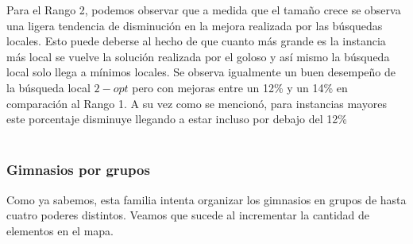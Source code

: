 Para el Rango 2, podemos observar que a medida que el tamaño crece se observa una ligera tendencia de disminución en la mejora realizada por las búsquedas locales. Esto puede deberse al hecho de que cuanto más grande es la instancia más local se vuelve la solución realizada por el goloso y así mismo la búsqueda local solo llega a mínimos locales. Se observa igualmente un buen desempeño de la búsqueda local $2-opt$ pero con mejoras entre un 12\% y un 14\% en comparación al Rango 1. A su vez como se mencionó, para instancias mayores este porcentaje disminuye llegando a estar incluso por debajo del 12\%
\\\\
 
\newpage
\subsubsection*{Gimnasios por grupos}

Como ya sabemos, esta familia intenta organizar los gimnasios en grupos de hasta cuatro poderes distintos. Veamos que sucede al incrementar la cantidad de elementos en el mapa.

\begin{figure}[h] 
 \centering
       \label{fig:gruposDist1}
    \label{fig:gruposMejora1}
    \end{figure}
 
